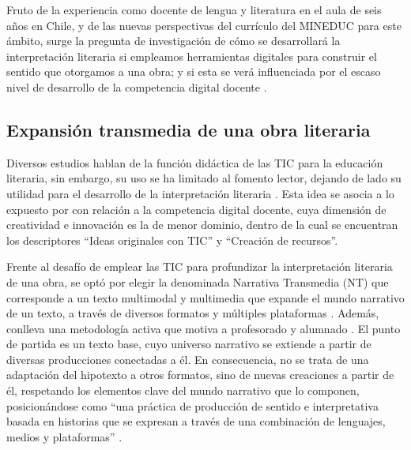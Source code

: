 \documentclass[spanish]{textolivre}
\begin{document}
Fruto de la experiencia como docente de lengua y literatura en el aula de seis años en Chile, y de las nuevas perspectivas del currículo del MINEDUC para este ámbito, surge la pregunta de investigación de cómo se desarrollará la interpretación literaria si empleamos herramientas digitales para construir el sentido que otorgamos a una obra; y si esta se verá influenciada por el escaso nivel de desarrollo de la competencia digital docente \cite{suazo_munoz_aproximacion_2022,ramos-pla_formacion_2022,aguilar_cuesta_covid-19_2022,guillen-gamez_formacion_2022,area_tecnologias_2021,gonzalez_integracion_2018}.

\subsection{Expansión transmedia de una obra literaria}\label{sec-fmt-manuscrito}
Diversos estudios hablan de la función didáctica de las TIC para la educación literaria, sin embargo, su uso se ha limitado al fomento lector, dejando de lado su utilidad para el desarrollo de la interpretación literaria \cite{margallo_gonzalez_educacion_2012}. Esta idea se asocia a lo expuesto por \textcite{aguilar_cuesta_covid-19_2022} con relación a la competencia digital docente, cuya dimensión de creatividad e innovación es la de menor dominio, dentro de la cual se encuentran los descriptores “Ideas originales con TIC” y “Creación de recursos”.

Frente al desafío de emplear las TIC para profundizar la interpretación literaria de una obra, se optó por elegir la denominada Narrativa Transmedia (NT) que corresponde a un texto multimodal y multimedia que expande el mundo narrativo de un texto, a través de diversos formatos y múltiples plataformas \cite{jenkins_convergence_2006,scolari_narrativas_2013,kalogeras_transmedia_2014,scolari_transmedia_2018}. Además, conlleva una metodología activa que motiva a profesorado y alumnado \cite{hernandez-ortega_metodologias_2021}. El punto de partida es un texto base, cuyo universo narrativo se extiende a partir de diversas producciones conectadas a él. En consecuencia, no se trata de una adaptación del hipotexto a otros formatos, sino de nuevas creaciones a partir de él, respetando los elementos clave del mundo narrativo que lo componen, posicionándose como “una práctica de producción de sentido e interpretativa basada en historias que se expresan a través de una combinación de lenguajes, medios y plataformas” \cite[p. 25]{scolari_narrativas_2013}.
\end{document}
